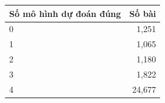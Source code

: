 \begin{tabular}{lr}\toprule
Số mô hình dự đoán đúng & Số bài\\\midrule
0 & 1,251\\
1 & 1,065\\
2 & 1,180\\
3 & 1,822\\
4 & 24,677\\
\bottomrule\end{tabular}
